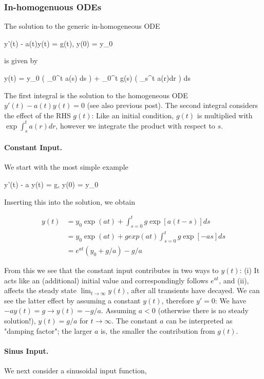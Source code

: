 
\subsubsection{In-homogenuous ODEs}

The solution to the generic in-homogeneous ODE

\bee
y'(t) - a(t)y(t) = g(t), \quad y(0) = y_0
\eee

is given by

\bee
y(t) = y_0 \exp \left( \int_0^t a(s) ds \right) + \int_0^t g(s) \left( \exp \int_s^t a(r)dr \right) ds
\eee

The first integral is the solution to the homogeneous ODE $y'(t) - a(t)y(t) = 0$ (see also previous post). The second integral considers the effect of the RHS $g(t)$: Like an initial condition, $g(t)$ is multiplied with $\exp \int_s^t a(r)dr$, however we integrate the product with respect to $s$.

\paragraph{Constant Input.} We start with the most simple example

\bee
y'(t) - a y(t) = g, \quad y(0) = y_0
\eee

Inserting this into the solution, we obtain

\begin{align*}
y(t) & = y_0 \exp (at) + \int_{s=0}^t g \exp \left[ a(t-s)\right] ds \\
&= y_0 \exp(at) +gexp(at) \int_{s=0}^t g \exp \left[ -as \right] ds \\
&= e^{at} (y_0 + g/a) - g/a
\end{align*}

From this we see that the constant input contributes in two ways to $y(t)$: (i) It acts like an (additional) initial value and correspondingly follows $e^{at}$, and (ii), affects the steady state $\lim_{t \rightarrow \infty} y(t)$, after all transients have decayed. We can see the latter effect by assuming a constant $y(t)$, therefore $y' = 0$: We have $-ay(t) = g \rightarrow y(t) = -g/a$. Assuming $a < 0$ (otherwise there is no steady solution!), $y(t) = g/a$ for $t \rightarrow \infty$. The constant $a$ can be interpreted as "damping factor"; the larger $a$ is, the smaller the contribution from $g(t)$.

\paragraph{Sinus Input.} We next consider a sinusoidal input function,

